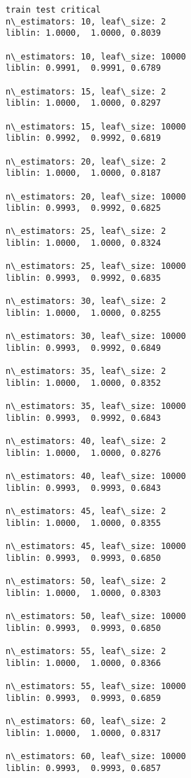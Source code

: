 \documentclass[10pt, t]{beamer}
\begin{document}
    \begin{Verbatim}[commandchars=\\\{\}]
train test critical
n\_estimators: 10, leaf\_size: 2
liblin: 1.0000,  1.0000, 0.8039 

n\_estimators: 10, leaf\_size: 10000
liblin: 0.9991,  0.9991, 0.6789 

n\_estimators: 15, leaf\_size: 2
liblin: 1.0000,  1.0000, 0.8297 

n\_estimators: 15, leaf\_size: 10000
liblin: 0.9992,  0.9992, 0.6819 

n\_estimators: 20, leaf\_size: 2
liblin: 1.0000,  1.0000, 0.8187 

n\_estimators: 20, leaf\_size: 10000
liblin: 0.9993,  0.9992, 0.6825 

n\_estimators: 25, leaf\_size: 2
liblin: 1.0000,  1.0000, 0.8324 

n\_estimators: 25, leaf\_size: 10000
liblin: 0.9993,  0.9992, 0.6835 

n\_estimators: 30, leaf\_size: 2
liblin: 1.0000,  1.0000, 0.8255 

n\_estimators: 30, leaf\_size: 10000
liblin: 0.9993,  0.9992, 0.6849 

n\_estimators: 35, leaf\_size: 2
liblin: 1.0000,  1.0000, 0.8352 

n\_estimators: 35, leaf\_size: 10000
liblin: 0.9993,  0.9992, 0.6843 

n\_estimators: 40, leaf\_size: 2
liblin: 1.0000,  1.0000, 0.8276 

n\_estimators: 40, leaf\_size: 10000
liblin: 0.9993,  0.9993, 0.6843 

n\_estimators: 45, leaf\_size: 2
liblin: 1.0000,  1.0000, 0.8355 

n\_estimators: 45, leaf\_size: 10000
liblin: 0.9993,  0.9993, 0.6850 

n\_estimators: 50, leaf\_size: 2
liblin: 1.0000,  1.0000, 0.8303 

n\_estimators: 50, leaf\_size: 10000
liblin: 0.9993,  0.9993, 0.6850 

n\_estimators: 55, leaf\_size: 2
liblin: 1.0000,  1.0000, 0.8366 

n\_estimators: 55, leaf\_size: 10000
liblin: 0.9993,  0.9993, 0.6859 

n\_estimators: 60, leaf\_size: 2
liblin: 1.0000,  1.0000, 0.8317 

n\_estimators: 60, leaf\_size: 10000
liblin: 0.9993,  0.9993, 0.6857 


    \end{Verbatim}
\end{document}
